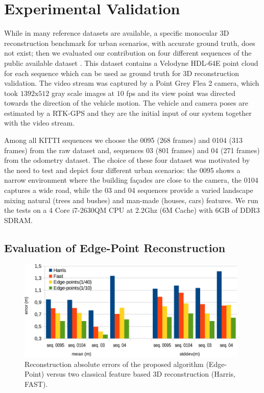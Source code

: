 \section{Experimental Validation}
While in \mvs many reference datasets are available, a specific monocular 3D reconstruction benchmark for urban scenarios, with accurate ground truth, does not exist; then we evaluated our contribution on four different sequences of the public available dataset \cite{geiger_et_al12}. 
This dataset contains a Velodyne HDL-64E point cloud for each sequence which can be used as ground truth for 3D reconstruction validation.
The video stream was captured by a Point Grey Flea 2 camera, which took $1392\text{x}512$ gray scale images at $10$ fps and its view point was directed towards the direction of the vehicle motion. 
The vehicle and camera poses are estimated by a RTK-GPS and they are the initial input of our system together with the video stream.

Among all KITTI sequences we choose the 0095 (268 frames) and 0104 (313 frames) from the raw dataset and, sequences 03 (801 frames) and 04 (271 frames) from the odometry dataset. 
The choice of these four dataset was motivated by the need  to test and depict four different urban scenarios: the 0095 shows a narrow environment where the building fa\c{c}ades are close to the camera, the 0104 captures a wide road, while the 03 and 04 sequences provide a varied landscape mixing natural (trees and bushes) and man-made (houses, cars) features. 
We run the tests on a 4 Core i7-2630QM CPU at 2.2Ghz (6M Cache) with 6GB of DDR3 SDRAM.

\subsection{Evaluation of Edge-Point Reconstruction}
\label{sec:experimental-results}
\begin{figure}[t]
  \centering
  \includegraphics[width=0.98\textwidth]{./img/risultati.pdf}
  \caption{Reconstruction absolute errors of the proposed algorithm (Edge-Point) versus two classical feature based 3D reconstruction (Harris, FAST).}
   \label{tab:comp}
\end{figure}

